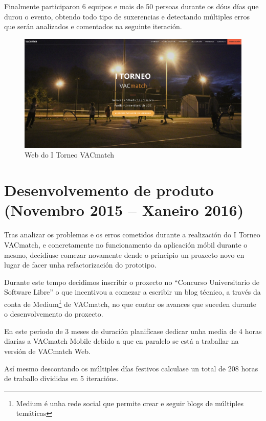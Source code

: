   Finalmente participaron 6 equipos e mais de 50 persoas durante os dóus días 
que durou o evento, obtendo todo tipo de suxerencias e detectando múltiples 
erros que serán analizados e comentados na seguinte iteración.

  \begin{figure}[h!]
        \begin{center}
        \includegraphics[width=\textwidth]{./img/torneo_vacmatch.png}
        \caption{Web do I Torneo VACmatch}
        \end{center}
  \end{figure}


  \section{Desenvolvemento de produto (Novembro 2015 -- Xaneiro 2016)}
  Tras analizar os problemas e os erros cometidos durante a realización do I 
Torneo VACmatch, e concretamente no funcionamento 
da aplicación móbil durante o 
mesmo, decidíuse comezar novamente dende o principio un proxecto novo en lugar 
de facer unha refactorización do prototipo.

    Durante este tempo decidimos inscribir o proxecto no ``Concurso 
Universitario de Software Libre'' o que incentivou a comezar a escribir un 
blog técnico, a través da conta de Medium\footnote{Medium é unha rede social 
que permite crear e seguir blogs de múltiples temáticas} de VACmatch, no que 
contar os avances que suceden durante o desenvolvemento do proxecto.

  En este periodo de 3 meses de duración planifícase dedicar unha media de 4 
horas diarias a VACmatch Mobile debido a que en paralelo se está a traballar na 
versión de VACmatch Web.

  Así mesmo descontando os múltiples días festivos calculase un total de 208 
horas de traballo divididas en 5 iteracións.


